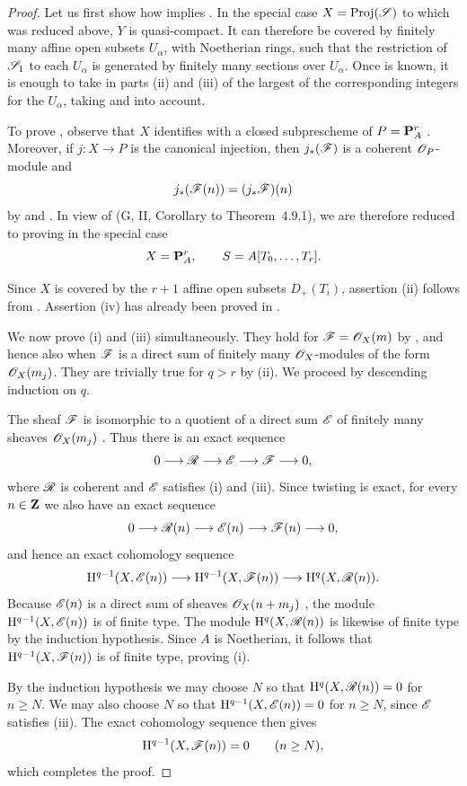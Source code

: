 \begin{proof}
Let us first show how  implies .
In the special case $X=\operatorname{Proj}(\mathscr{S})$ to which  was reduced above, $Y$ is quasi-compact.
It can therefore be covered by finitely many affine open subsets $U_\alpha$, with Noetherian rings, such that the restriction of $\mathscr{S}_1$ to each $U_\alpha$ is generated by finitely many sections over $U_\alpha$.
Once  is known, it is enough to take in parts (ii) and (iii) of  the largest of the corresponding integers for the $U_\alpha$, taking  and  into account.

To prove , observe that $X$ identifies with a closed subprescheme of $P=\mathbf{P}_A^r$ .
Moreover, if $j:X\to P$ is the canonical injection, then $j_*(\mathscr{F})$ is a coherent $\mathscr{O}_P$-module and
\[
  j_*(\mathscr{F}(n))=(j_*\mathscr{F})(n)
\]
by  and .
In view of (G, II, Corollary to Theorem~4.9.1), we are therefore reduced to proving  in the special case
\[
  X=\mathbf{P}_A^r,
  \qquad S=A[T_0,\ldots,T_r].
\]


Since $X$ is covered by the $r+1$ affine open subsets $D_+(T_i)$, assertion (ii) follows from .
Assertion (iv) has already been proved in .

We now prove (i) and (iii) simultaneously.
They hold for $\mathscr{F}=\mathscr{O}_X(m)$ by , and hence also when $\mathscr{F}$ is a direct sum of finitely many $\mathscr{O}_X$-modules of the form $\mathscr{O}_X(m_j)$.
They are trivially true for $q>r$ by (ii).
We proceed by descending induction on $q$.

The sheaf $\mathscr{F}$ is isomorphic to a quotient of a direct sum $\mathscr{E}$ of finitely many sheaves $\mathscr{O}_X(m_j)$ .
Thus there is an exact sequence
\[
  0\longrightarrow\mathscr{R}\longrightarrow\mathscr{E}
   \longrightarrow\mathscr{F}\longrightarrow0,
\]
where $\mathscr{R}$ is coherent  and $\mathscr{E}$ satisfies (i) and (iii).
Since twisting is exact, for every $n\in\mathbf{Z}$ we also have an exact sequence
\[
  0\longrightarrow\mathscr{R}(n)\longrightarrow\mathscr{E}(n)
   \longrightarrow\mathscr{F}(n)\longrightarrow0,
\]
and hence an exact cohomology sequence
\[
  \mathrm{H}^{q-1}(X,\mathscr{E}(n))
  \longrightarrow\mathrm{H}^{q-1}(X,\mathscr{F}(n))
  \longrightarrow\mathrm{H}^q(X,\mathscr{R}(n)).
\]
Because $\mathscr{E}(n)$ is a direct sum of sheaves $\mathscr{O}_X(n+m_j)$ , the module $\mathrm{H}^{q-1}(X,\mathscr{E}(n))$ is of finite type.
The module $\mathrm{H}^q(X,\mathscr{R}(n))$ is likewise of finite type by the induction hypothesis.
Since $A$ is Noetherian, it follows that $\mathrm{H}^{q-1}(X,\mathscr{F}(n))$ is of finite type, proving (i).

By the induction hypothesis we may choose $N$ so that $\mathrm{H}^q(X,\mathscr{R}(n))=0$ for $n\geq N$.
We may also choose $N$ so that $\mathrm{H}^{q-1}(X,\mathscr{E}(n))=0$ for $n\geq N$, since $\mathscr{E}$ satisfies (iii).
The exact cohomology sequence then gives
\[
  \mathrm{H}^{q-1}(X,\mathscr{F}(n))=0
  \qquad(n\geq N),
\]
which completes the proof.
\end{proof}

